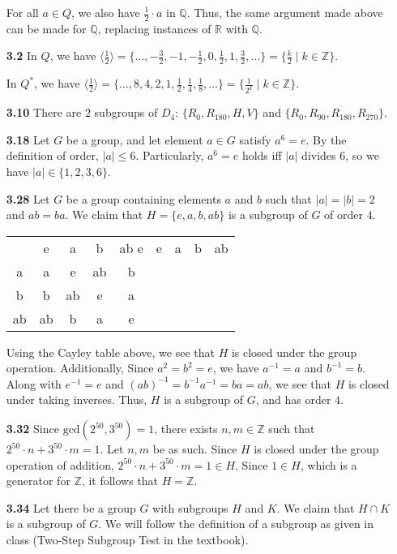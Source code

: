 \documentclass[11pt,letterpaper]{article}
\begin{document}
\begin{enumerate}
For all $a\in{Q}$, we also have $\frac{1}{2}\cdot{a}$ in $\mathbb{Q}$. Thus, the same argument made above can be made for $\mathbb{Q}$, replacing instances of $\mathbb{R}$ with $\mathbb{Q}$.
\item[\textbf{3.2}] In $Q$, we have $\langle{\frac{1}{2}}\rangle{} = \{\dots, -\frac{3}{2}, -1, -\frac{1}{2}, 0, \frac{1}{2}, 1, \frac{3}{2}, \dots\} = \{\frac{k}{2} \mid k\in{\mathbb{Z}}\}$.

In $Q^\ast$, we have $\langle{\frac{1}{2}}\rangle{} = \{\dots, 8, 4, 2, 1, \frac{1}{2}, \frac{1}{4}, \frac{1}{8}, \dots\} = \{\frac{1}{2^k} \mid k\in{\mathbb{Z}}\}$.
\item[\textbf{3.10}] There are $2$ subgroups of $D_4$: $\{R_0,R_{180},H,V\}$ and $\{R_0,R_{90},R_{180},R_{270}\}$.
\item[\textbf{3.18}] Let $G$ be a group, and let element $a\in{G}$ satisfy $a^6=e$. By the definition of order, $|a|\leq{6}$. Particularly, $a^6=e$ holds iff $|a|$ divides $6$, so we have $|a|\in\{1,2,3,6\}$.
\item[\textbf{3.28}] Let $G$ be a group containing elements $a$ and $b$ such that $|a|=|b|=2$ and $ab=ba$. We claim that $H=\{e,a,b,ab\}$ is a subgroup of $G$ of order $4$.

\noindent\begin{tabular}{c | c c c c}
    & e & a & b & ab
   \cr{}
   e & e & a & b & ab \\
   a & a & e & ab & b \\
   b & b & ab & e & a \\
   ab & ab & b & a & e \\
\end{tabular}

Using the Cayley table above, we see that $H$ is closed under the group operation. Additionally, Since $a^2=b^2=e$, we have $a^{-1}=a$ and $b^{-1}=b$. Along with $e^{-1}=e$ and $(ab)^{-1}=b^{-1}a^{-1}=ba=ab$, we see that $H$ is closed under taking inverses. Thus, $H$ is a subgroup of $G$, and has order $4$. \qedsymbol

\item[\textbf{3.32}] Since $\text{gcd}(2^{50},3^{50})=1$, there exists $n,m\in{\mathbb{Z}}$ such that $2^{50}\cdot{n}+3^{50}\cdot{m}=1$. Let $n,m$ be as such. Since $H$ is closed under the group operation of addition, $2^{50}\cdot{n}+3^{50}\cdot{m}=1\in{H}$. Since $1\in{H}$, which is a generator for $\mathbb{Z}$, it follows that $H=\mathbb{Z}$.
\item[\textbf{3.34}] Let there be a group $G$ with subgroups $H$ and $K$. We claim that $H\cap{K}$ is a subgroup of $G$. We will follow the definition of a subgroup as given in class (Two-Step Subgroup Test in the textbook).


\end{enumerate}
\end{document}
